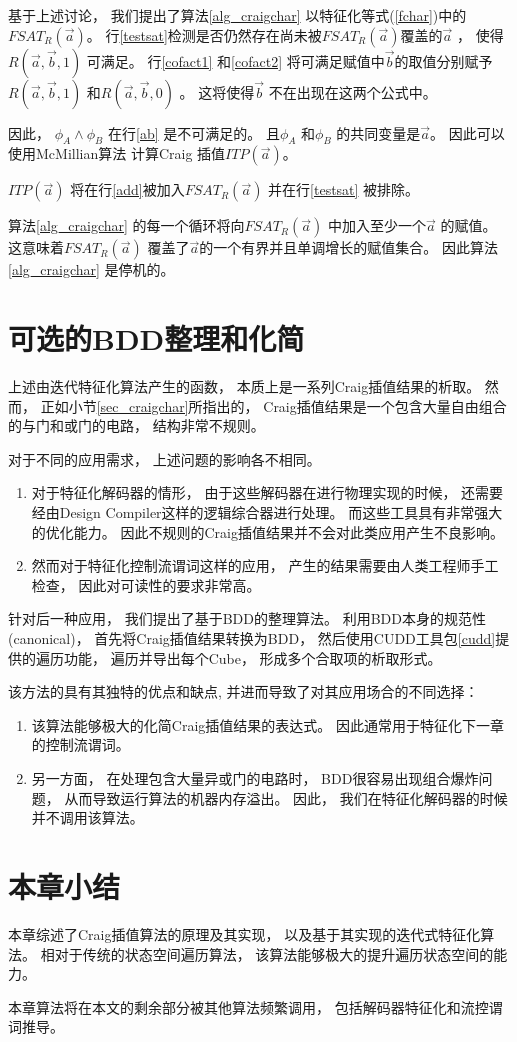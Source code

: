 基于上述讨论，
我们提出了算法\ref{alg_craigchar} 以特征化等式(\ref{fchar})中的$FSAT_R(\vec{a})$。
行\ref{testsat}检测是否仍然存在尚未被$FSAT_R(\vec{a})$覆盖的$\vec{a}$ ，
使得$R(\vec{a},\vec{b},1)$ 可满足。
行\ref{cofact1} 和\ref{cofact2} 将可满足赋值中$\vec{b}$的取值分别赋予
$R(\vec{a},\vec{b},1)$ 和$R(\vec{a},\vec{b},0)$ 。
这将使得$\vec{b}$ 不在出现在这两个公式中。

因此，
$\phi_A\wedge \phi_B$ 在行\ref{ab} 是不可满足的。
且$\phi_A$ 和$\phi_B$ 的共同变量是$\vec{a}$。
因此可以使用McMillian算法 计算Craig 插值$ITP(\vec{a})$。

$ITP(\vec{a})$ 将在行\ref{add}被加入$FSAT_R(\vec{a})$  并在行\ref{testsat} 被排除。

算法\ref{alg_craigchar} 的每一个循环将向$FSAT_R(\vec{a})$ 中加入至少一个$\vec{a}$ 的赋值。
这意味着$FSAT_R(\vec{a})$ 覆盖了$\vec{a}$的一个有界并且单调增长的赋值集合。
因此算法\ref{alg_craigchar} 是停机的。

\section{可选的BDD整理和化简}\label{sec_bdd_simp}

上述由迭代特征化算法产生的函数，
本质上是一系列Craig插值结果的析取。
然而，
正如小节\ref{sec_craigchar}所指出的，
Craig插值结果是一个包含大量自由组合的与门和或门的电路，
结构非常不规则。

对于不同的应用需求，
上述问题的影响各不相同。
\begin{enumerate}
\item 对于特征化解码器的情形，
由于这些解码器在进行物理实现的时候，
还需要经由Design Compiler这样的逻辑综合器进行处理。
而这些工具具有非常强大的优化能力。
因此不规则的Craig插值结果并不会对此类应用产生不良影响。
\item 然而对于特征化控制流谓词这样的应用，
产生的结果需要由人类工程师手工检查，
因此对可读性的要求非常高。
\end{enumerate}

针对后一种应用，
我们提出了基于BDD的整理算法。
利用BDD本身的规范性(canonical)，
首先将Craig插值结果转换为BDD，
然后使用CUDD工具包\ref{cudd}提供的遍历功能，
遍历并导出每个Cube，
形成多个合取项的析取形式。

该方法的具有其独特的优点和缺点,
并进而导致了对其应用场合的不同选择：

\begin{enumerate}
\item 该算法能够极大的化简Craig插值结果的表达式。
因此通常用于特征化下一章的控制流谓词。

\item 另一方面，
在处理包含大量异或门的电路时，
BDD很容易出现组合爆炸问题，
从而导致运行算法的机器内存溢出。
因此，
我们在特征化解码器的时候并不调用该算法。
\end{enumerate}

\section{本章小结}
本章综述了Craig插值算法的原理及其实现，
以及基于其实现的迭代式特征化算法。
相对于传统的状态空间遍历算法，
该算法能够极大的提升遍历状态空间的能力。

本章算法将在本文的剩余部分被其他算法频繁调用，
包括解码器特征化和流控谓词推导。
